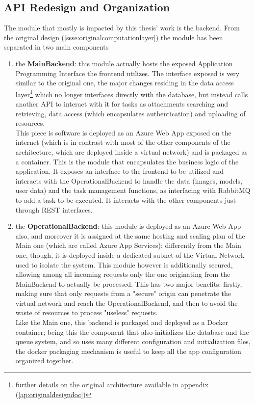 \subsection{API Redesign and Organization}
  The module that mostly is impacted by this thesis' work is the backend. From the original design (\ref{ssse:originalcomputationlayer}) the module has been separated in two main components
  \begin{enumerate}
    \item the \textbf{MainBackend}: this module actually hosts the exposed Application Programming Interface the frontend utilizes. The interface exposed is very similar to the original one, the major changes residing in the data access layer\footnote{further details on the original architecture available in appendix (\ref{ap:originaldesigndoc})} which no longer interfaces directly with the database, but instead calls another API to interact with it for tasks as attachments searching and retrieving, data access (which encapsulates authentication) and uploading of resources.\\
      This piece is software is deployed as an Azure Web App exposed on the internet (which is in contrast with most of the other components of the architecture, which are deployed inside a virtual network) and is packaged as a container. This is the module that encapsulates the business logic of the application. It exposes an interface to the frontend to be utilized and interacts with the OperationalBackend to handle the data (images, models, user data) and the task management functions, as interfacing with RabbitMQ to add a task to be executed. It interacts with the other components just through REST interfaces.
    \item the \textbf{OperationalBackend}: this module is deployed as an Azure Web App also, and moreover it is assigned at the same hosting and scaling plan of the Main one (which are called Azure App Services); differently from the Main one, though, it is deployed inside a dedicated subnet of the Virtual Network used to isolate the system. This module however is additionally secured, allowing among all incoming requests only the one originating from the MainBackend to actually be processed. This has two major benefits: firstly, making sure that only requests from a "secure" origin can penetrate the virtual network and reach the OperationalBackend, and then to avoid the waste of resources to process "useless" requests.\\
      Like the Main one, this backend is packaged and deployed as a Docker container; being this the component that also initializes the database and the queue system, and so uses many different configuration and initialization files, the docker packaging mechanism is useful to keep all the app configuration organized together.\\

\end{enumerate}
